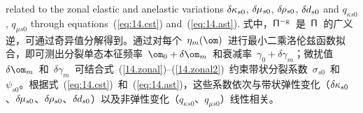 related to the zonal elastic and anelastic variations
$\delta\hspace{-0.1 mm}\kappa_{s0}$, $\delta\hspace{-0.2 mm}\mu_{s0}$,
$\delta\hspace{-0.2 mm}\rho_{s0}$, $\delta\hspace{-0.1 mm}d_{s0}$ and
$q_{{\kappa}s0}$, $q_{{\mu}s0}$ through equations~(\ref{eq:14.cst})
and~(\ref{eq:14.ast}).
\fi
式中，${\sf\Pi}^{-{\rm g}}$~是~${\sf\Pi}$~的广义逆，可通过奇异值分解得到。通过对每个~$\eta_m(\om)$~进行最小二乘洛伦兹函数拟合，即可测出分裂单态本征频率~$\om_0+\delta\om_m$~和衰减率~$\gamma_0+\delta\gamma_m$；微扰值~$\delta\om_m$~和~$\delta\gamma_m$~可结合式~(\ref{14.zonal})--(\ref{14.zonal2})~约束带状分裂系数~$\sigma_{s0}$~和~$\psi_{s0}$。根据式~(\ref{eq:14.cst})~和~(\ref{eq:14.ast})，这些系数依次与带状弹性变化（$\delta\hspace{-0.1 mm}\kappa_{s0}$、$\delta\hspace{-0.2 mm}\mu_{s0}$、$\delta\hspace{-0.2 mm}\rho_{s0}$、$\delta\hspace{-0.1 mm}d_{s0}$）以及非弹性变化（$q_{{\kappa}s0}$、$q_{{\mu}s0}$）线性相关。

